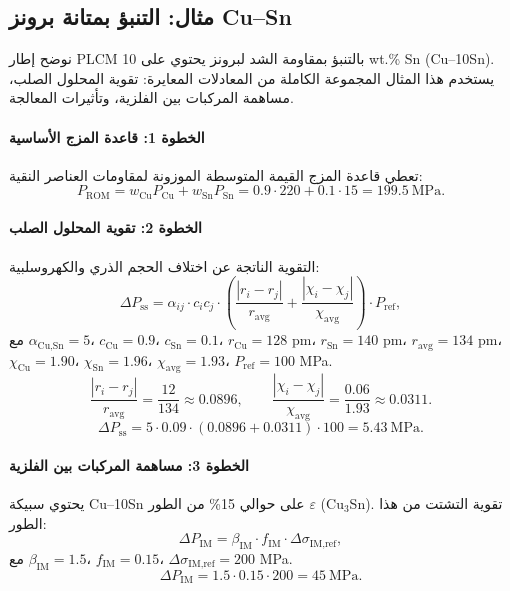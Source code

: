 \documentclass[11pt,a4paper]{article}
\begin{document}
	\begin{otherlanguage}{arabic}
		
		\subsection{مثال: التنبؤ بمتانة برونز Cu–Sn}
		\label{subsec:example-bronze}
		
		نوضح إطار PLCM بالتنبؤ بمقاومة الشد لبرونز يحتوي على 10 wt.\% Sn (Cu–10Sn). يستخدم هذا المثال المجموعة الكاملة من المعادلات المعايرة: تقوية المحلول الصلب، مساهمة المركبات بين الفلزية، وتأثيرات المعالجة.
		
		\paragraph{الخطوة 1: قاعدة المزج الأساسية}
		تعطي قاعدة المزج القيمة المتوسطة الموزونة لمقاومات العناصر النقية:
		\[
		P_{\text{ROM}} = w_{\text{Cu}} P_{\text{Cu}} + w_{\text{Sn}} P_{\text{Sn}} = 0.9 \cdot 220 + 0.1 \cdot 15 = 199.5\ \text{MPa}.
		\]
		
		\paragraph{الخطوة 2: تقوية المحلول الصلب}
		التقوية الناتجة عن اختلاف الحجم الذري والكهروسلبية:
		\[
		\Delta P_{\text{ss}} = \alpha_{ij} \cdot c_i c_j \cdot \left( \frac{|r_i - r_j|}{r_{\text{avg}}} + \frac{|\chi_i - \chi_j|}{\chi_{\text{avg}}} \right) \cdot P_{\text{ref}},
		\]
		مع \(\alpha_{\text{Cu,Sn}} = 5\)، \(c_{\text{Cu}}=0.9\)، \(c_{\text{Sn}}=0.1\)، \(r_{\text{Cu}}=128\) pm، \(r_{\text{Sn}}=140\) pm، \(r_{\text{avg}}=134\) pm، \(\chi_{\text{Cu}}=1.90\)، \(\chi_{\text{Sn}}=1.96\)، \(\chi_{\text{avg}}=1.93\)، \(P_{\text{ref}} = 100\) MPa.
		\[
		\frac{|r_i - r_j|}{r_{\text{avg}}} = \frac{12}{134} \approx 0.0896, \qquad
		\frac{|\chi_i - \chi_j|}{\chi_{\text{avg}}} = \frac{0.06}{1.93} \approx 0.0311.
		\]
		\[
		\Delta P_{\text{ss}} = 5 \cdot 0.09 \cdot (0.0896 + 0.0311) \cdot 100 = 5.43\ \text{MPa}.
		\]
		
		\paragraph{الخطوة 3: مساهمة المركبات بين الفلزية}
		يحتوي سبيكة Cu–10Sn على حوالي 15\% من الطور \(\varepsilon\) (Cu\(_3\)Sn). تقوية التشتت من هذا الطور:
		\[
		\Delta P_{\text{IM}} = \beta_{\text{IM}} \cdot f_{\text{IM}} \cdot \Delta \sigma_{\text{IM,ref}},
		\]
		مع \(\beta_{\text{IM}} = 1.5\)، \(f_{\text{IM}} = 0.15\)، \(\Delta \sigma_{\text{IM,ref}} = 200\) MPa.
		\[
		\Delta P_{\text{IM}} = 1.5 \cdot 0.15 \cdot 200 = 45\ \text{MPa}.
		\]
		

\end{otherlanguage}
\end{document}
